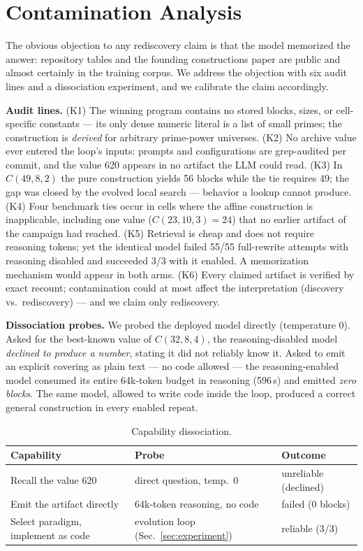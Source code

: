 \section{Contamination Analysis}\label{sec:contamination}

The obvious objection to any rediscovery claim is that the model
memorized the answer: repository tables and the founding
constructions paper are public and almost certainly in the training
corpus. We address the objection with six audit lines and a
dissociation experiment, and we calibrate the claim accordingly.

\textbf{Audit lines.} (K1) The winning program contains no stored
blocks, sizes, or cell-specific constants --- its only dense numeric
literal is a list of small primes; the construction is \emph{derived}
for arbitrary prime-power universes. (K2) No archive value ever
entered the loop's inputs: prompts and configurations are
grep-audited per commit, and the value 620 appears in no artifact the
LLM could read. (K3) In $C(49,8,2)$ the pure construction yields 56
blocks while the tie requires 49; the gap was closed by the evolved
local search --- behavior a lookup cannot produce. (K4) Four
benchmark ties occur in cells where the affine construction is
inapplicable, including one value ($C(23,10,3)=24$) that no earlier
artifact of the campaign had reached. (K5) Retrieval is cheap and
does not require reasoning tokens; yet the identical model failed
55/55 full-rewrite attempts with reasoning disabled and succeeded 3/3
with it enabled. A memorization mechanism would appear in both arms.
(K6) Every claimed artifact is verified by exact recount;
contamination could at most affect the interpretation (discovery
vs.\ rediscovery) --- and we claim only rediscovery.

\textbf{Dissociation probes.} We probed the deployed model directly
(temperature 0). Asked for the best-known value of $C(32,8,4)$, the
reasoning-disabled model \emph{declined to produce a number}, stating
it did not reliably know it. Asked to emit an explicit covering as
plain text --- no code allowed --- the reasoning-enabled model
consumed its entire 64k-token budget in reasoning (596\,s) and
emitted \emph{zero blocks}. The same model, allowed to write code
inside the loop, produced a correct general construction in every
enabled repeat.

\begin{table}
\caption{Capability dissociation.}
\label{tab:dissociation}
\small
\begin{tabular}{lll}
\toprule
Capability & Probe & Outcome \\
\midrule
Recall the value 620 & direct question, temp.\ 0 & unreliable
(declined) \\
Emit the artifact directly & 64k-token reasoning, no code & failed
(0 blocks) \\
Select paradigm, implement as code & evolution loop
(Sec.~\ref{sec:experiment}) & reliable (3/3) \\
\bottomrule
\end{tabular}
\end{table}

